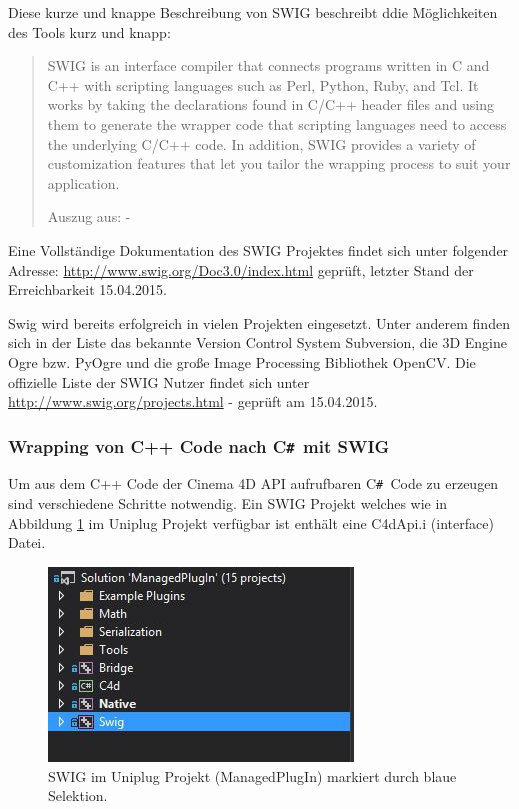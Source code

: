 \documentclass[pagesize, paper=a4, fontsize=12pt, titlepage=true, headings=small, headnosepline, abstractoff, liststotoc, nochapterprefix, plainheadsepline, twoside]{scrreprt}
\newcommand{\CSS}{C\texttt{\# }}
\begin{document}
Diese kurze und knappe Beschreibung von SWIG beschreibt ddie Möglichkeiten des Tools kurz und knapp:
\begin{quote}
SWIG is an interface compiler that connects programs written in C and C++ with scripting languages such as Perl, Python, Ruby, and Tcl. It works by taking the declarations found in C/C++ header files and using them to generate the wrapper code that scripting languages need to access the underlying C/C++ code. In addition, SWIG provides a variety of customization features that let you tailor the wrapping process to suit your application.

Auszug aus: - 
\end{quote}

Eine Vollständige Dokumentation des SWIG Projektes findet sich unter folgender Adresse: \url{http://www.swig.org/Doc3.0/index.html} geprüft, letzter Stand der Erreichbarkeit 15.04.2015.

Swig wird bereits erfolgreich in vielen Projekten eingesetzt. Unter anderem finden sich in der Liste das bekannte Version Control System Subversion, die 3D Engine Ogre bzw. PyOgre und die große Image Processing Bibliothek OpenCV. Die offizielle Liste der SWIG Nutzer findet sich unter \url{http://www.swig.org/projects.html} - geprüft am 15.04.2015.

\subsubsection{Wrapping von C++ Code nach \CSS mit SWIG}


Um aus dem C++ Code der Cinema 4D API aufrufbaren \CSS Code zu erzeugen sind verschiedene Schritte notwendig. Ein SWIG Projekt welches wie in Abbildung \ref{SWIGUniplug} im Uniplug Projekt verfügbar ist enthält eine C4dApi.i (interface) Datei.

\begin{figure}[ht]
	\centering
	\includegraphics[width=\linewidth/2]{Bilder/ProjektstrukturSwig.JPG}
	\caption{SWIG im Uniplug Projekt (ManagedPlugIn) markiert durch blaue Selektion.}
	\label{SWIGUniplug}
\end{figure}
\end{document}
